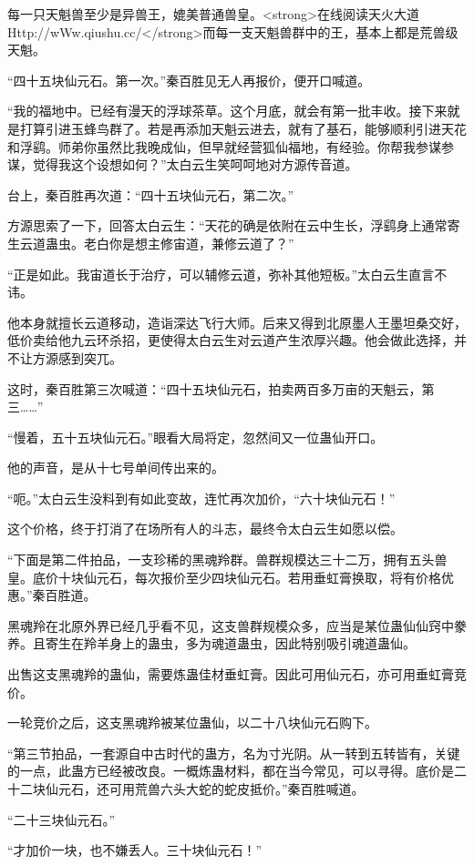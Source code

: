 \begin{this_body}
每一只天魁兽至少是异兽王，媲美普通兽皇。<strong>在线阅读天火大道Http://wWw.qiushu.cc/</strong>而每一支天魁兽群中的王，基本上都是荒兽级天魁。

“四十五块仙元石。第一次。”秦百胜见无人再报价，便开口喊道。

“我的福地中。已经有漫天的浮球茶草。这个月底，就会有第一批丰收。接下来就是打算引进玉蜂鸟群了。若是再添加天魁云进去，就有了基石，能够顺利引进天花和浮鹞。师弟你虽然比我晚成仙，但早就经营狐仙福地，有经验。你帮我参谋参谋，觉得我这个设想如何？”太白云生笑呵呵地对方源传音道。

台上，秦百胜再次道：“四十五块仙元石，第二次。”

方源思索了一下，回答太白云生：“天花的确是依附在云中生长，浮鹞身上通常寄生云道蛊虫。老白你是想主修宙道，兼修云道了？”

“正是如此。我宙道长于治疗，可以辅修云道，弥补其他短板。”太白云生直言不讳。

他本身就擅长云道移动，造诣深达飞行大师。后来又得到北原墨人王墨坦桑交好，低价卖给他九云环杀招，更使得太白云生对云道产生浓厚兴趣。他会做此选择，并不让方源感到突兀。

这时，秦百胜第三次喊道：“四十五块仙元石，拍卖两百多万亩的天魁云，第三……”

“慢着，五十五块仙元石。”眼看大局将定，忽然间又一位蛊仙开口。

他的声音，是从十七号单间传出来的。

“呃。”太白云生没料到有如此变故，连忙再次加价，“六十块仙元石！”

这个价格，终于打消了在场所有人的斗志，最终令太白云生如愿以偿。

“下面是第二件拍品，一支珍稀的黑魂羚群。兽群规模达三十二万，拥有五头兽皇。底价十块仙元石，每次报价至少四块仙元石。若用垂虹膏换取，将有价格优惠。”秦百胜道。

黑魂羚在北原外界已经几乎看不见，这支兽群规模众多，应当是某位蛊仙仙窍中豢养。且寄生在羚羊身上的蛊虫，多为魂道蛊虫，因此特别吸引魂道蛊仙。

出售这支黑魂羚的蛊仙，需要炼蛊佳材垂虹膏。因此可用仙元石，亦可用垂虹膏竞价。

一轮竞价之后，这支黑魂羚被某位蛊仙，以二十八块仙元石购下。

“第三节拍品，一套源自中古时代的蛊方，名为寸光阴。从一转到五转皆有，关键的一点，此蛊方已经被改良。一概炼蛊材料，都在当今常见，可以寻得。底价是二十二块仙元石，还可用荒兽六头大蛇的蛇皮抵价。”秦百胜喊道。

“二十三块仙元石。”

“才加价一块，也不嫌丢人。三十块仙元石！”


\end{this_body}
